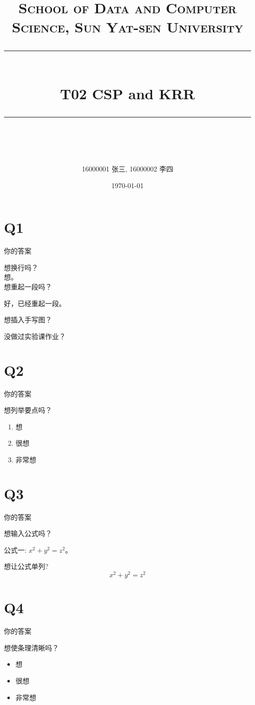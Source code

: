 \documentclass[a4paper, 11pt]{article}
\title{
\normalfont \normalsize
\textsc{School of Data and Computer Science, Sun Yat-sen University} \\ [25pt] %
\rule{\textwidth}{0.5pt} \\[0.4cm] %
\huge  T02 CSP and KRR\\ %
\rule{\textwidth}{2pt} \\[0.5cm] %
\author{16000001 张三, 16000002 李四}
\date{\normalsize\today}
}
\begin{document}
\maketitle
\tableofcontents
\newpage
\section{Q1}
你的答案

想换行吗？\\
想。\\
想重起一段吗？

好，已经重起一段。

想插入手写图？

没做过实验课作业？
\section{Q2}
你的答案


想列举要点吗？

\begin{enumerate}
\item 想
\item 很想
\item 非常想
\end{enumerate}
\section{Q3}
你的答案

想输入公式吗？

公式一: $x^2+y^2=z^2$。

想让公式单列?
$$x^2+y^2=z^2$$
\section{Q4}
你的答案

想使条理清晰吗？

\begin{itemize}
\item 想
\item 很想
\item 非常想
\end{itemize}

%
%
\end{document}
